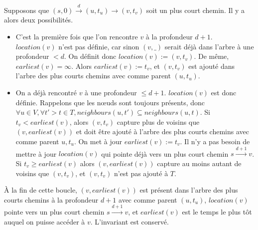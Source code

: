 \documentclass[12pt,a4paper]{article}
\begin{document}
Supposons que \((s, 0) \xrightarrow{d} (u, t_u) \rightarrow (v, t_v)\)
soit un plus court chemin. Il y a alors deux possibilités.
\begin{itemize}
\item C'est la première fois que l'on rencontre \(v\) à la profondeur
  \(d + 1\). \(location(v)\) n'est pas définie, car sinon \((v, \_)\)
  serait déjà dans l'arbre à une profondeur \(< d\). On définit donc
  \(location(v) := (v, t_v)\). De même, \(earliest(v) =
  \infty\). Alors \(earliest(v) := t_v\), et \((v, t_v)\) est ajouté
  dans l'arbre des plus courts chemins avec comme parent \((u, t_u)\).
\item On a déjà rencontré \(v\) à une profondeur \(\leq d +
  1\). \(location(v)\) est donc définie. Rappelons que les nœuds sont
  toujours présents, donc
  \(\forall u \in V, \forall t' > t \in T, neighbours(u, t') \subseteq
  neighbours(u, t)\). Si \(t_v < earliest(v)\), alors \((v, t_v)\)
  capture plus de voisins que \((v, earliest(v))\) et doit être ajouté
  à l'arbre des plus courts chemins avec comme parent \(u, t_u\). On
  met à jour \(earliest(v) := t_v\). Il n'y a pas besoin de mettre à
  jour \(location(v)\) qui pointe déjà vers un plus court chemin
  \(s \xrightarrow{d+1} v\). Si \(t_v \geq earliest(v)\) alors
  \((v, earliest(v))\) capture au moins autant de voisins que
  \((v, t_v)\), et \((v, t_v)\) n'est pas ajouté à \(T\).
\end{itemize}
À la fin de cette boucle, \((v, earliest(v))\) est présent dans
l'arbre des plus courts chemins à la profondeur \(d + 1\) avec comme
parent \((u, t_u)\), \(location(v)\) pointe vers un plus court chemin
\(s \xrightarrow{d+1} v\), et \(earliest(v)\) est le temps le plus tôt
auquel on puisse accéder à \(v\). L'invariant est conservé.\\
\end{document}
